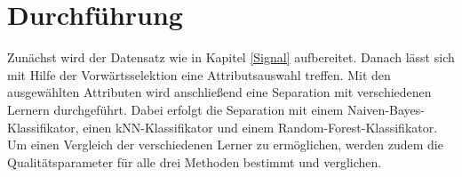 \section{Durchführung}
Zunächst wird der Datensatz wie in Kapitel \ref{Signal} aufbereitet. Danach lässt sich mit Hilfe der Vorwärtsselektion eine Attributsauswahl treffen. Mit den ausgewählten Attributen wird anschließend eine Separation mit verschiedenen Lernern durchgeführt. Dabei erfolgt die Separation mit einem Naiven-Bayes-Klassifikator, einen kNN-Klassifikator und einem Random-Forest-Klassifikator. \\
Um einen Vergleich der verschiedenen Lerner zu ermöglichen, werden zudem die Qualitätsparameter für alle drei Methoden bestimmt und verglichen.
